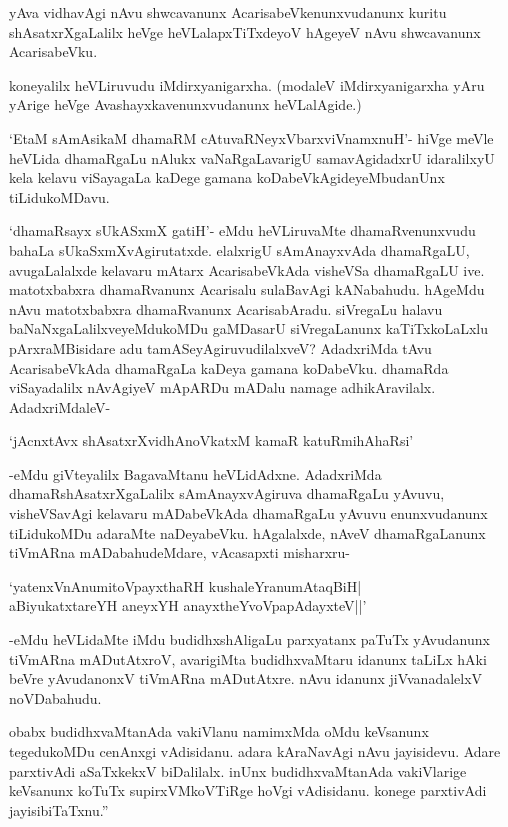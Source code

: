 yAva vidhavAgi nAvu shwcavanunx AcarisabeVkenunxvudanunx kuritu shAsatxrXgaLalilx heVge heVLalapxTiTxdeyoV hAgeyeV nAvu shwcavanunx AcarisabeVku.

koneyalilx heVLiruvudu iMdirxyanigarxha. (modaleV iMdirxyanigarxha yAru yArige heVge Avashayxkavenunxvudanunx heVLalAgide.) 

`EtaM sAmAsikaM dhamaRM cAtuvaRNeyxV\s barxviVnamxnuH'- hiVge meVle heVLida dhamaRgaLu nAlukx vaNaRgaLavarigU samavAgidadxrU idaralilxyU kela kelavu viSayagaLa kaDege gamana koDabeVkAgideyeMbudanUnx tiLidukoMDavu.

`dhamaRsayx sUkASxmX gatiH'- eMdu heVLiruvaMte dhamaRvenunxvudu bahaLa sUkaSxmXvAgirutatxde. elalxrigU sAmAnayxvAda dhamaRgaLU, avugaLalalxde kelavaru mAtarx AcarisabeVkAda visheVSa dhamaRgaLU ive. matotxbabxra dhamaRvanunx Acarisalu sulaBavAgi kANabahudu. hAgeMdu nAvu matotxbabxra dhamaRvanunx AcarisabAradu. siVregaLu halavu baNaNxgaLalilxveyeMdukoMDu gaMDasarU siVregaLanunx kaTiTxkoLaLxlu pArxraMBisidare adu tamASeyAgiruvudilalxveV? AdadxriMda tAvu AcarisabeVkAda dhamaRgaLa kaDeya gamana koDabeVku. dhamaRda viSayadalilx nAvAgiyeV mApARDu mADalu namage adhikAravilalx. AdadxriMdaleV-

\begin{shloka}
`jAcnxtAvx shAsatxrXvidhAnoVkatxM kamaR katuRmihAhaRsi'
\end{shloka} 

-eMdu giVteyalilx BagavaMtanu heVLidAdxne. AdadxriMda dhamaRshAsatxrXgaLalilx sAmAnayxvAgiruva dhamaRgaLu yAvuvu, visheVSavAgi kelavaru mADabeVkAda dhamaRgaLu yAvuvu enunxvudanunx tiLidukoMDu adaraMte naDeyabeVku. hAgalalxde, nAveV dhamaRgaLanunx tiVmARna mADabahudeMdare, vAcasapxti misharxru-

\begin{shloka}
`yatenxVnAnumitoVpayxthaRH kushaleYranumAtaqBiH|\\
aBiyukatxtareYH aneyxYH anayxtheYvoVpapAdayxteV||'
\end{shloka}

-eMdu heVLidaMte iMdu budidhxshAligaLu parxyatanx paTuTx yAvudanunx tiVmARna mADutAtxroV, avarigiMta budidhxvaMtaru idanunx taLiLx hAki beVre yAvudanonxV tiVmARna mADutAtxre. nAvu idanunx jiVvanadalelxV noVDabahudu.

obabx budidhxvaMtanAda vakiVlanu namimxMda oMdu keVsanunx tegedukoMDu cenAnxgi vAdisidanu. adara kAraNavAgi nAvu jayisidevu. Adare parxtivAdi aSaTxkekxV biDalilalx. inUnx budidhxvaMtanAda vakiVlarige keVsanunx koTuTx supirxVMkoVTiRge hoVgi vAdisidanu. konege parxtivAdi jayisibiTaTxnu.''

